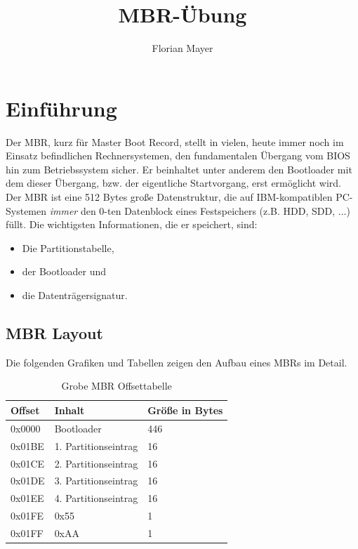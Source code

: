 \documentclass[11pt,a4paper]{article}
\begin{document}
\title{\color{black} MBR-Übung}
\author{\color{darkblue} Florian Mayer}
\maketitle

\tableofcontents

\section{Einführung}
Der MBR, kurz für Master Boot Record, stellt in vielen, heute
immer noch im Einsatz befindlichen Rechnersystemen, den fundamentalen
Übergang vom BIOS hin zum Betriebssystem sicher. Er beinhaltet unter anderem
den Bootloader mit dem dieser Übergang, bzw. der eigentliche Startvorgang,
erst ermöglicht wird. Der MBR ist eine 512 Bytes
große Datenstruktur, die auf IBM-kompatiblen PC-Systemen \emph{immer}
den 0-ten Datenblock eines Festspeichers (z.B. HDD, SDD, ...) füllt.
Die wichtigsten Informationen, die er speichert, sind:
\begin{itemize}
	\item Die Partitionstabelle,
	\item der Bootloader und
	\item die Datenträgersignatur.
\end{itemize}

\subsection{MBR Layout}
Die folgenden Grafiken und Tabellen zeigen den Aufbau eines MBRs im Detail.

\begin{table}[h]
	\begin{center}
		\begin{tabular}[c]{ | l | l | l |}
		\hline
		\cellcolor{grey} Offset & \cellcolor{grey} Inhalt & \cellcolor{grey} Größe in Bytes \\ \hline
		0x0000 & Bootloader & 446\\ \hline
		0x01BE & 1. Partitionseintrag & 16 \\ \hline
		0x01CE & 2. Partitionseintrag & 16 \\ \hline
		0x01DE & 3. Partitionseintrag & 16 \\ \hline
		0x01EE & 4. Partitionseintrag & 16 \\ \hline
		0x01FE & 0x55 & 1\\ \hline
		0x01FF & 0xAA & 1\\ \hline
		\end{tabular}
	\end{center}
	
	\caption{Grobe MBR Offsettabelle}
	\label{tab:mbr_layout_tbl}
\end{table}
\end{document}
